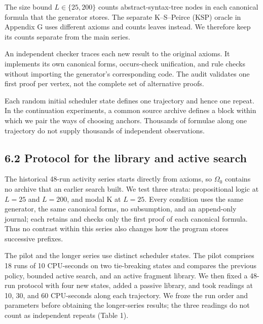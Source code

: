 \documentclass[pdflatex,sn-basic,Numbered]{sn-jnl}
\begin{document}
The size bound \(L \in \{ 25,200\}\) counts abstract-syntax-tree nodes in each canonical formula that the generator stores. The separate K--S--Peirce (KSP) oracle in Appendix G uses different axioms and counts leaves instead. We therefore keep its counts separate from the main series.

An independent checker traces each new result to the original axioms. It implements its own canonical forms, occurs-check unification, and rule checks without importing the generator's corresponding code. The audit validates one first proof per vertex, not the complete set of alternative proofs.

Each random initial scheduler state defines one trajectory and hence one repeat. In the continuation experiments, a common source archive defines a block within which we pair the ways of choosing anchors. Thousands of formulae along one trajectory do not supply thousands of independent observations.

\subsection*{6.2 Protocol for the library and active search}\label{protocol-for-the-library-and-active-search}

The historical 48-run activity series starts directly from axioms, so \(\Omega_{0}\) contains no archive that an earlier search built. We test three strata: propositional logic at \(L = 25\) and \(L = 200\), and modal K at \(L = 25\). Every condition uses the same generator, the same canonical forms, no subsumption, and an append-only journal; each retains and checks only the first proof of each canonical formula. Thus no contrast within this series also changes how the program stores successive prefixes.

The pilot and the longer series use distinct scheduler states. The pilot comprises 18 runs of 10 CPU-seconds on two tie-breaking states and compares the previous policy, bounded active search, and an active fragment library. We then fixed a 48-run protocol with four new states, added a passive library, and took readings at 10, 30, and 60 CPU-seconds along each trajectory. We froze the run order and parameters before obtaining the longer-series results; the three readings do not count as independent repeats (Table 1).

\begingroup
\small
\setlength{\tabcolsep}{3pt}
\renewcommand{\arraystretch}{1.13}
\end{document}
